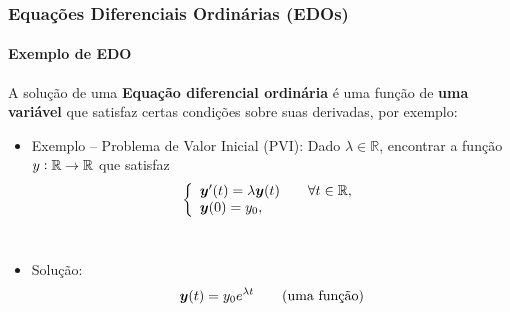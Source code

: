 \documentclass[usenames,dvipsnames,brazil,aspectratio=169]{beamer}
\begin{document}
\begin{frame}[t]
    \frametitle{Equações Diferenciais Ordinárias (EDOs)}
    \framesubtitle{Exemplo de EDO}

    A solução de uma \textbf{Equação diferencial ordinária} é uma função de \textbf{uma variável} que satisfaz certas condições sobre suas derivadas, por exemplo:
    \pula

    \pause
    
    \begin{itemize}
        \item<+-> Exemplo -- Problema de Valor Inicial (PVI):
        Dado $\lambda \in \mathbb{R}$, encontrar a função $y: {\mathbb{R}} \to {\mathbb{R}}$ que satisfaz
        \begin{equation*}
            \left\{
                \begin{array}{l}
                    \vetor{y}'(t) = \lambda \vetor{y}(t) \quad \quad\forall t\in\R,\\
                    \vetor{y}(0) = y_0,
                \end{array}
            \right.
        \end{equation*}
        ~\\
            
        \item<+-> Solução: 
            \begin{alignat*}{2}
                {\bm {y}}(t) = y_0 e^{\lambda t} \quad \quad \text{(uma função)}
            \end{alignat*} 
    \end{itemize}
\end{frame}
\end{document}
